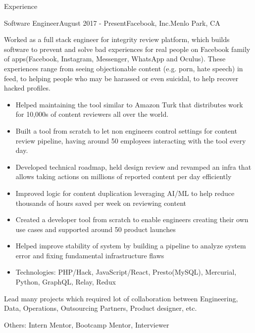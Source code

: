 \documentclass{resume} %
\begin{document}
\center


\begin{rSection}{Experience}
\begin{rSubsection}{Software Engineer}{August 2017 - Present}{Facebook, Inc.}{Menlo Park, CA}
\item Worked as a full stack engineer for integrity review platform, which builds software to prevent and solve bad experiences for real people on Facebook family of apps(Facebook, Instagram, Messenger, WhatsApp and Oculus). These experiences range from seeing objectionable content (e.g. porn, hate speech) in feed, to helping people who may be harassed or even suicidal, to help recover hacked profiles.
\begin{itemize}
\item Helped maintaining the tool similar to Amazon Turk that distributes work for 10,000s of content reviewers all over the world.
\item Built a tool from scratch to let non engineers control settings for content review pipeline, having around 50 employees interacting with the tool every day.
\item Developed technical roadmap, held design review and revamped an infra that allows taking actions on millions of reported content per day efficiently
\item Improved logic for content duplication leveraging AI/ML to help reduce thousands of hours saved per week on reviewing content
\item Created a developer tool from scratch to enable engineers creating their own use cases and supported around 50 product launches
\item Helped improve stability of system by building a pipeline to analyze system error and fixing fundamental infrastructure flaws
\item Technologies: PHP/Hack, JavaScript/React, Presto(MySQL), Mercurial, Python, GraphQL, Relay, Redux
\end{itemize}
\item Lead many projects which required lot of collaboration between Engineering, Data, Operations, Outsourcing Partners, Product designer, etc.
\item Others: Intern Mentor, Bootcamp Mentor, Interviewer


\end{rSubsection}
\end{rSection}
\end{document}
